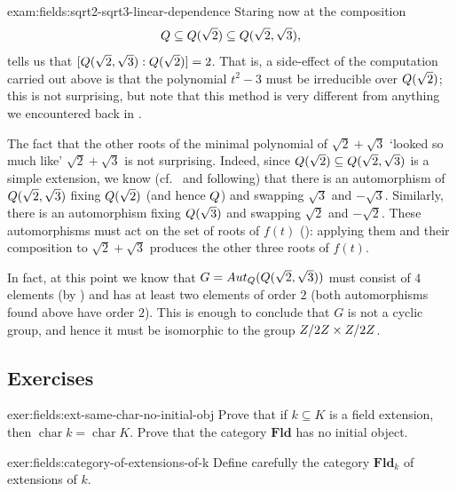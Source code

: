 \begin{exam}{}{exam:fields:sqrt2-sqrt3-linear-dependence}
  Staring now at the composition
  \[
    Q \subseteq Q(\sqrt{2}) \subseteq Q(\sqrt{2},\sqrt{3}),
  \]
   tells us that
  $[Q(\sqrt{2},\sqrt{3}) : Q(\sqrt{2})] = 2$.  That is, a
  side-effect of the computation carried out above is that the
  polynomial $t^2 - 3$ must be irreducible over $Q(\sqrt{2})$; this
  is not surprising, but note that this method is very different from
  anything we encountered back in
  .

  The fact that the other roots of the minimal polynomial of
  $\sqrt{2}+\sqrt{3}$ `looked so much like' $\sqrt{2}+\sqrt{3}$ is not
  surprising. Indeed, since
  $Q(\sqrt{2}) \subseteq Q(\sqrt{2},\sqrt{3})$ is a simple
  extension, we know (cf.\  and following) that
  there is an automorphism of $Q(\sqrt{2},\sqrt{3})$ fixing
  $Q(\sqrt{2})$ (and hence $Q$) and swapping $\sqrt{3}$ and
  $-\sqrt{3}$.  Similarly, there is an automorphism fixing
  $Q(\sqrt{3})$ and swapping $\sqrt{2}$ and $-\sqrt{2}$. These
  automorphisms must act on the set of roots of $f(t)$
  (): applying them and
  their composition to $\sqrt{2}+\sqrt{3}$ produces the other three
  roots of $f(t)$.

  In fact, at this point we know that
  $G = Aut_{Q}(Q(\sqrt{2},\sqrt{3}))$ must consist of $4$ elements
  (by ) and has at least two elements of order
  $2$ (both automorphisms found above have order $2$). This is enough
  to conclude that $G$ is not a cyclic group, and hence it must be
  isomorphic to the group $Z/2Z \times Z/2Z$.
\end{exam}

\subsection*{Exercises}

\begin{exer}{}{exer:fields:ext-same-char-no-initial-obj}
  Prove that if $k \subseteq K$ is a field extension, then
  $\operatorname{char} k = \operatorname{char} K$. Prove that the
  category $\mathbf{Fld}$ has no initial object.
\end{exer}

\begin{exer}{}{exer:fields:category-of-extensions-of-k}
  Define carefully the category $\mathbf{Fld}_k$ of extensions of $k$.
\end{exer}

